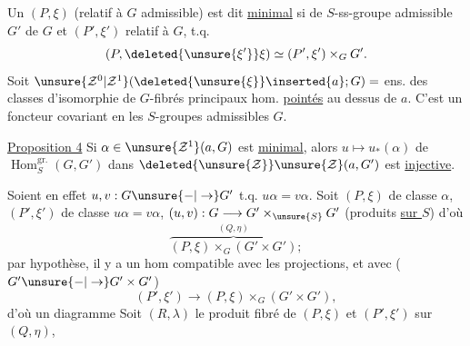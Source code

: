 Un $(P,\xi)$  (relatif à $G$ admissible) est dit \uline{minimal} si  de $S$-ss-groupe admissible $G'$ de $G$ et $(P',\xi')$ relatif à $G$, t.q.
\[
(P,\deleted{\unsure{\xi'}}\xi)\simeq(P',\xi')\times_G G'.
\]
 Soit $\unsure{\mathcal Z^0|\mathcal Z^1}(\deleted{\unsure{\xi}}\inserted{a};G)=$ ens. des classes d'isomorphie de $G$-fibrés principaux hom. \uline{pointés} au dessus de $a$. C'est un foncteur covariant en les $S$-groupes admissibles $G$.

\uline{Proposition 4} Si $\alpha\in\unsure{\mathcal Z^1}(a,G)$ est \uline{minimal}, alors $u\mapsto u_*(\alpha)$ de $\operatorname{Hom}^{\mathrm{gr.}}_S(G,G')$ dans $\deleted{\unsure{\mathcal Z}}\unsure{\mathcal Z}(a,G')$ est \uline{injective}.

Soient en effet $u,v:G\unsure{-|\to}G'$ t.q. $u\alpha=v\alpha$. Soit $(P,\xi)$ de classe $\alpha$, $(P',\xi')$ de classe $u\alpha=v\alpha$, $(u,v):G\longrightarrow G'\times_{\unsure{S}}G'$ (produits \uline{sur $S$}) d'où
\[
\overbrace{(P,\xi)\times_G(G'\times G')}^{(Q,\eta)};
\]
par hypothèse, il y a un hom compatible avec les projections, et avec  ($G'\unsure{-|\to}G'\times G'$)
\[
(P',\xi')\longrightarrow(P,\xi)\times_G(G'\times G'),
\]
d'où un diagramme
Soit $(R,\lambda)$ le produit fibré de $(P,\xi)$ et $(P',\xi')$ sur $(Q,\eta)$,
